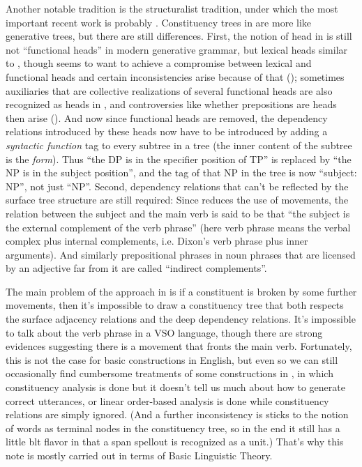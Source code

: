 \documentclass[UTF8, a4paper, oneside, scheme=plain]{ctexrep}
\newcommand*{\citepage}[1]{pp.~{#1}}
\begin{document}
Another notable tradition is the structuralist tradition,
under which the most important recent work is probably \citet{cgel}.
Constituency trees in \citet{cgel} are more like generative trees,
but there are still differences.
First, the notion of head in \citet{cgel} is still not ``functional heads'' 
in modern generative grammar, but lexical heads similar to \citet{dixon2009basic1},
though \citet[\citepage{357}]{cgel} seems to want to achieve a compromise between lexical and functional heads 
and certain inconsistencies arise because of that ();
sometimes auxiliaries that are collective realizations of several functional heads 
are also recognized as heads in \citet{cgel}, 
and controversies like whether prepositions are heads then arise
().
And now since functional heads are removed,
the dependency relations introduced by these heads
now have to be introduced by adding a \emph{syntactic function} tag 
to every subtree in a tree
(the inner content of the subtree is the \emph{form}).
Thus ``the DP is in the specifier position of TP''
is replaced by ``the NP is in the subject position'',
and the tag of that NP in the tree is now ``subject: NP'',
not just ``NP''.
Second, dependency relations that can't be reflected by the surface tree structure are still required:
Since \citet{cgel} reduces the use of movements,
the relation between the subject and the main verb 
is said to be that ``the subject is the external complement of the verb phrase''
(here verb phrase means the verbal complex plus internal complements,
i.e. Dixon's verb phrase plus inner arguments).
And similarly prepositional phrases in noun phrases that are licensed by an adjective far from it 
are called ``indirect complements''.

The main problem of the approach in \citet{cgel} is 
if a constituent is broken by some further movements,
then it's impossible to draw a constituency tree that 
both respects the surface adjacency relations 
and the deep dependency relations.
It's impossible to talk about the verb phrase in a VSO language,
though there are strong evidences suggesting there is a movement that fronts the main verb.
Fortunately, this is not the case for basic constructions in English,
but even so we can still occasionally find cumbersome treatments of some constructions in \citet{cgel},
in which constituency analysis is done but it doesn't tell us much about 
how to generate correct utterances,
or linear order-based analysis is done while constituency relations are simply ignored.
(And a further inconsistency is \citet{cgel} sticks 
to the notion of words as terminal nodes in the constituency tree,
so in the end it still has a little \acl{blt} flavor 
in that a span spellout is recognized as a unit.)
That's why this note is mostly carried out in terms of Basic Linguistic Theory.
\end{document}
